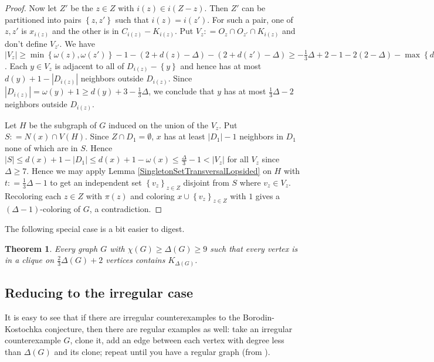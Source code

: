 \documentclass[12pt]{article}
\theoremstyle{plain}
\newtheorem{thm}{Theorem}[section]
\theoremstyle{definition}
\theoremstyle{remark}
\newcommand{\set}[1]{\left\{ #1 \right\}}
\newcommand{\card}[1]{\left|#1\right|}
\newcommand{\parens}[1]{\left( #1 \right)}
\newcommand{\DefinedAs}{\mathrel{\mathop:}=}
\begin{document}
\begin{proof}
Now let $Z'$ be the $z \in Z$ with $i(z) \in i(Z - z)$. Then $Z'$ can be partitioned into pairs $\set{z, z'}$ such that $i(z) = i(z')$.  For such a pair, one of $z,z'$ is $x_{i(z)}$ and the other is in $C_{i(z)} - K_{i(z)}$. Put $V_z \DefinedAs O_z \cap O_{z'} \cap K_{i(z)}$ and don't define $V_{z'}$.  We have $\card{V_z} \geq \min\set{\omega(z), \omega(z')} - 1 - \parens{2 + d(z) - \Delta} - \parens{2 + d(z') - \Delta} \geq - \frac13 \Delta + 2 - 1 - 2\parens{2 - \Delta} - \max\set{d(z), d(z')} = \frac53 \Delta - \max\set{d(z), d(z')} - 3 \geq \frac23 \Delta - 3$.  Each $y \in V_z$ is adjacent to all of $D_{i(z)} - \set{y}$ and hence has at most $d(y) + 1 - \card{D_{i(z)}}$ neighbors outside $D_{i(z)}$.  Since $\card{D_{i(z)}} = \omega(y) + 1 \geq d(y) + 3 - \frac13 \Delta$, we conclude that $y$ has at most $\frac13 \Delta - 2$ neighbors outside $D_{i(z)}$.

Let $H$ be the subgraph of $G$ induced on the union of the $V_z$.  Put $S \DefinedAs N(x) \cap V(H)$.  Since $Z \cap D_1 = \emptyset$, $x$ has at least $\card{D_1} - 1$ neighbors in $D_1$ none of which are in $S$.  Hence $\card{S} \leq d(x) + 1 - \card{D_1} \leq d(x) + 1 - \omega(x) \leq \frac{\Delta}{3} - 1 < \card{V_z}$ for all $V_z$ since $\Delta \geq 7$. Hence we may apply Lemma
\ref{SingletonSetTransversalLopsided} on $H$ with $t \DefinedAs \frac13\Delta - 1$ to get an independent set $\set{v_z}_{z\in Z}$ disjoint from $S$ where $v_z \in V_z$. Recoloring each $z \in Z$ with $\pi(z)$ and
coloring $x \cup \set{v_z}_{z \in Z}$ with $1$ gives a $(\Delta - 1)$-coloring
of $G$, a contradiction.
\end{proof}

The following special case is a bit easier to digest.

\begin{thm}\label{TwoThirdsCliqueCor}
Every graph $G$ with $\chi(G) \geq \Delta(G) \geq 9$ such that every
vertex is in a clique on $\frac23\Delta(G) + 2$ vertices contains $K_{\Delta(G)}$.
\end{thm}

\subsection{Reducing to the irregular case}
It is easy to see that if there are irregular counterexamples to the
Borodin-Kostochka conjecture, then there are regular examples as well: take an
irregular counterexample $G$, clone it, add an edge between each vertex with degree
less than $\Delta(G)$ and its clone; repeat until you have a regular graph (from
\cite{molloy2002graph}).
\end{document}
